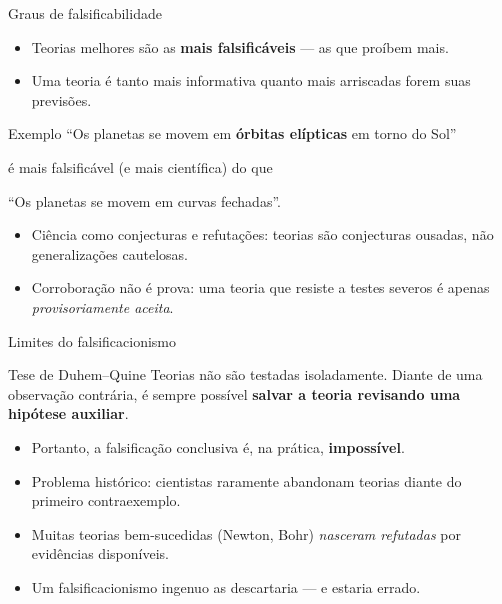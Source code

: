 \documentclass[aspectratio=169]{beamer}
\newcommand{\impt}[1]{\textcolor{maccent}{\textbf{#1}}}
\newcommand{\ntc}[1]{\textcolor{mprimary}{#1}}
\begin{document}
\begin{frame}{Graus de falsificabilidade}
\begin{itemize}
    \item Teorias melhores s\~ao as \impt{mais falsific\'aveis} --- as que pro\'ibem mais.
    \item Uma teoria \'e tanto mais informativa quanto mais \ntc{arriscadas} forem suas previs\~oes.
\end{itemize}
\vspace{0.3cm}
\begin{block}{Exemplo}
``Os planetas se movem em \impt{\'orbitas el\'ipticas} em torno do Sol''

\hspace{1cm}\'e mais falsific\'avel (e mais cient\'ifica) do que

``Os planetas se movem em curvas fechadas''.
\end{block}
\vspace{0.3cm}
\begin{itemize}
    \item \ntc{Ci\^encia como conjecturas e refuta\c c\~oes}: teorias s\~ao conjecturas ousadas, n\~ao generaliza\c c\~oes cautelosas.
    \item \ntc{Corrobora\c c\~ao} n\~ao \'e prova: uma teoria que resiste a testes severos \'e apenas \emph{provisoriamente aceita}.
\end{itemize}
\end{frame}

\begin{frame}{Limites do falsificacionismo}
\begin{block}{Tese de Duhem--Quine}
Teorias n\~ao s\~ao testadas isoladamente. Diante de uma observa\c c\~ao contr\'aria, \'e sempre poss\'ivel \impt{salvar a teoria revisando uma hip\'otese auxiliar}.
\end{block}
\vspace{0.3cm}
\begin{itemize}
    \item Portanto, a falsifica\c c\~ao conclusiva \'e, na pr\'atica, \impt{imposs\'ivel}.
    \item \ntc{Problema hist\'orico}: cientistas raramente abandonam teorias diante do primeiro contraexemplo.
    \item Muitas teorias bem-sucedidas (Newton, Bohr) \emph{nasceram refutadas} por evid\^encias dispon\'iveis.
    \item Um falsificacionismo ingenuo as descartaria --- e estaria errado.
\end{itemize}
\end{frame}
\end{document}
